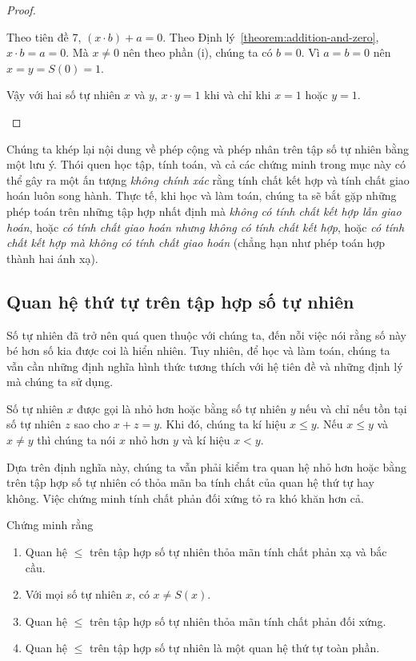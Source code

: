 \begin{proof}
\begin{enumerate}[label={(\roman*)}]
		      Theo tiên đề 7, $(x\cdot b) + a = 0$. Theo Định lý~\ref{theorem:addition-and-zero}, $x\cdot b = a = 0$. Mà $x\ne 0$ nên theo phần (i), chúng ta có $b = 0$. Vì $a = b = 0$ nên $x = y = S(0) = 1$.

		      Vậy với hai số tự nhiên $x$ và $y$, $x\cdot y = 1$ khi và chỉ khi $x = 1$ hoặc $y = 1$.
	\end{enumerate}
\end{proof}

Chúng ta khép lại nội dung về phép cộng và phép nhân trên tập số tự nhiên bằng một lưu ý. Thói quen học tập, tính toán, và cả các chứng minh trong mục này có thể gây ra một ấn tượng \textit{không chính xác} rằng tính chất kết hợp và tính chất giao hoán luôn song hành. Thực tế, khi học và làm toán, chúng ta sẽ bắt gặp những phép toán trên những tập hợp nhất định mà \textit{không có tính chất kết hợp lẫn giao hoán}, hoặc \textit{có tính chất giao hoán nhưng không có tính chất kết hợp}, hoặc \textit{có tính chất kết hợp mà không có tính chất giao hoán} (chẳng hạn như phép toán hợp thành hai ánh xạ).

\subsection*{Quan hệ thứ tự trên tập hợp số tự nhiên}

Số tự nhiên đã trở nên quá quen thuộc với chúng ta, đến nỗi việc nói rằng số này bé hơn số kia được coi là hiển nhiên. Tuy nhiên, để học và làm toán, chúng ta vẫn cần những định nghĩa hình thức tương thích với hệ tiên đề và những định lý mà chúng ta sử dụng.

\begin{definition}
	Số tự nhiên $x$ được gọi là nhỏ hơn hoặc bằng số tự nhiên $y$ nếu và chỉ nếu tồn tại số tự nhiên $z$ sao cho $x + z = y$. Khi đó, chúng ta kí hiệu $x\leq y$. Nếu $x\leq y$ và $x\ne y$ thì chúng ta nói $x$ nhỏ hơn $y$ và kí hiệu $x < y$.
\end{definition}

Dựa trên định nghĩa này, chúng ta vẫn phải kiểm tra quan hệ nhỏ hơn hoặc bằng trên tập hợp số tự nhiên có thỏa mãn ba tính chất của quan hệ thứ tự hay không. Việc chứng minh tính chất phản đối xứng tỏ ra khó khăn hơn cả.

\begin{proposition}
	Chứng minh rằng
	\begin{enumerate}[label={(\roman*)}]
		\item Quan hệ $\leq$ trên tập hợp số tự nhiên thỏa mãn tính chất phản xạ và bắc cầu.
		\item Với mọi số tự nhiên $x$, có $x\ne S(x)$.
		\item Quan hệ $\leq$ trên tập hợp số tự nhiên thỏa mãn tính chất phản đối xứng.
		\item Quan hệ $\leq$ trên tập hợp số tự nhiên là một quan hệ thứ tự toàn phần.
	\end{enumerate}
\end{proposition}

